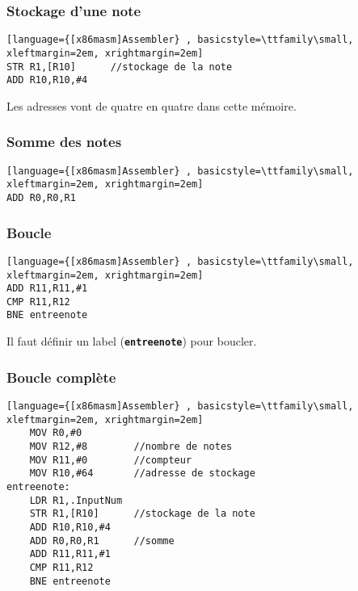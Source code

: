 \documentclass[svgnames,11pt]{beamer}
\begin{document}
\begin{frame}[fragile]
    \frametitle{Stockage d'une note}

\begin{center}
\begin{lstlisting}[language={[x86masm]Assembler} , basicstyle=\ttfamily\small, xleftmargin=2em, xrightmargin=2em]
STR R1,[R10]      //stockage de la note
ADD R10,R10,#4
\end{lstlisting}
\end{center}
\begin{aretenir}[Commentaire]
Les adresses vont de quatre en quatre dans cette mémoire.
\end{aretenir}
\end{frame}
\begin{frame}[fragile]
    \frametitle{Somme des notes}

\begin{center}
\begin{lstlisting}[language={[x86masm]Assembler} , basicstyle=\ttfamily\small, xleftmargin=2em, xrightmargin=2em]
ADD R0,R0,R1
\end{lstlisting}
\end{center}
\end{frame}
\begin{frame}[fragile]
    \frametitle{Boucle}

\begin{center}
\begin{lstlisting}[language={[x86masm]Assembler} , basicstyle=\ttfamily\small, xleftmargin=2em, xrightmargin=2em]
ADD R11,R11,#1
CMP R11,R12
BNE entreenote
\end{lstlisting}
\end{center}
\begin{aretenir}[Commentaire]
Il faut définir un label (\textbf{\texttt{entreenote}}) pour boucler.
\end{aretenir}
\end{frame}
\begin{frame}[fragile]
    \frametitle{Boucle complète}

\begin{center}
\begin{lstlisting}[language={[x86masm]Assembler} , basicstyle=\ttfamily\small, xleftmargin=2em, xrightmargin=2em]
    MOV R0,#0
    MOV R12,#8        //nombre de notes
    MOV R11,#0        //compteur
    MOV R10,#64       //adresse de stockage
entreenote:
    LDR R1,.InputNum
    STR R1,[R10]      //stockage de la note
    ADD R10,R10,#4
    ADD R0,R0,R1      //somme
    ADD R11,R11,#1
    CMP R11,R12
    BNE entreenote
\end{lstlisting}
\end{center}
\end{frame}
\end{document}
